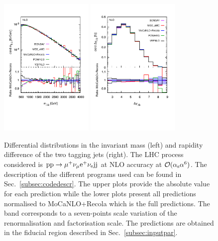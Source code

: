  \begin{figure}[hbt!]
   \centering
   \includegraphics[width=0.4\textwidth,angle=0,clip=true,trim={0.4cm 2cm 0.cm 1.cm}]{figures/NLO/mjj_NLO.pdf}
   \includegraphics[width=0.4\textwidth,angle=0,clip=true,trim={0.4cm 2cm 0.cm 1.cm}]{figures/NLO/dyj1j2_NLO.pdf}
\caption{\label{fig:distNLO1} Differential distributions in the invariant mass (left) and rapidity difference of the two tagging jets (right).
The LHC process considered is ${\rm p}{\rm p}\to\mu^+\nu_\mu{\rm e}^+\nu_{\rm e}{\rm j}{\rm j}$ at NLO accuracy at $\mathcal{O}(\alpha_{\rm s}\alpha^6)$.
The description of the different programs used can be found in Sec.~\ref{subsec:codedescr}.
The upper plots provide the absolute value for each prediction while the lower plots present all predictions normalised to {\sc MoCaNLO}+{\sc Recola} which is the full predictions.
The band corresponds to a seven-points scale variation of the renormalisation and factorisation scale.
The predictions are obtained in the fiducial region described in Sec.~\ref{subsec:inputpar}.
}
\end{figure}

